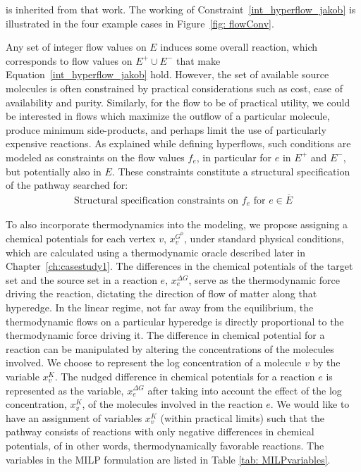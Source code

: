 is inherited from that work. The working of Constraint~\eqref{int_hyperflow_jakob} is illustrated in the four example cases in Figure~\ref{fig: flowConv}. 

Any set of integer flow values on $E$ induces some overall reaction, which corresponds to flow values on $E^+ \cup E^-$ that make Equation~\eqref{int_hyperflow_jakob} hold.
However, the set of available source molecules is often constrained by practical considerations such as cost, ease of availability and purity.
Similarly, for the flow to be of practical utility, we could be interested in flows which maximize the outflow of a particular molecule, produce minimum side-products, and perhaps limit the use of particularly expensive reactions.
As explained while defining hyperflows, such conditions are modeled as constraints on the flow values $f_e$, in particular for $e$ in $E^+$ and $E^-$, but potentially also in $E$.
These constraints constitute a structural specification of the pathway searched for:
\begin{align}
    \text{Structural specification constraints on $f_e$ for } e \in \overline{E} \label{inflow_outflow_constraints}
\end{align}

To also incorporate thermodynamics into the modeling, we propose assigning a chemical potentials for each vertex $v$, $x^{G^0}_v$, under standard physical conditions,
which are calculated using a thermodynamic oracle described later in Chapter~\ref{ch:casestudy1}.
The differences in the chemical potentials of the target set and the source set in a reaction $e$, $x^{\Delta G}_e$, serve as the thermodynamic force driving the reaction, dictating the direction of flow of matter along that hyperedge.
In the linear regime, not far away from the equilibrium, the thermodynamic flows on a particular hyperedge is directly proportional to the thermodynamic force driving it.
The difference in chemical potential for a reaction can be manipulated by altering the concentrations of the molecules involved. 
We choose to represent the log concentration of a molecule $v$ by the variable $x_v^K$.
The nudged difference in chemical potentials for a reaction $e$ is represented as the variable, $x^{\Delta G}_e$ after taking into account the effect of the log concentration, $x_v^K$, of the molecules involved in the reaction $e$.
We would like to have an assignment of variables $x_v^K$ (within practical limits) such that the pathway consists of reactions with only negative differences in chemical potentials, of in other words, thermodynamically favorable reactions. The variables in the MILP formulation are listed in Table \ref{tab: MILPvariables}. 

